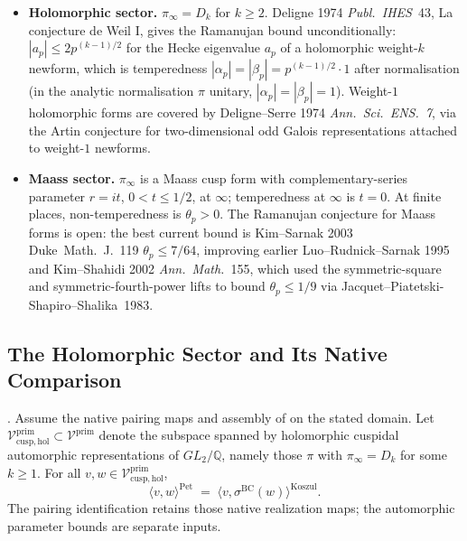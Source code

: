\begin{itemize}
\item \textbf{Holomorphic sector.} \(\pi_{\infty}=D_{k}\) for
\(k\geq 2\). Deligne 1974 \emph{Publ.~IHES}~43, La conjecture de Weil
I, gives the Ramanujan bound unconditionally: \(|a_{p}|\leq 2 p^{(k-1)/2}\)
for the Hecke eigenvalue \(a_{p}\) of a holomorphic weight-\(k\) newform,
which is temperedness
\(|\alpha_{p}|=|\beta_{p}|=p^{(k-1)/2}\cdot 1\) after normalisation
(in the analytic normalisation \(\pi\) unitary,
\(|\alpha_{p}|=|\beta_{p}|=1\)). Weight-\(1\) holomorphic forms are
covered by Deligne--Serre 1974 \emph{Ann.~Sci.~ENS.~7}, via the
Artin conjecture for two-dimensional odd Galois representations
attached to weight-\(1\) newforms.
\item \textbf{Maass sector.} \(\pi_{\infty}\) is a Maass cusp form with
complementary-series parameter \(r=it\), \(0<t\leq 1/2\), at \(\infty\);
temperedness at \(\infty\) is \(t=0\). At finite places, non-temperedness
is \(\theta_{p}>0\). The Ramanujan conjecture for Maass forms is open:
the best current bound is Kim--Sarnak 2003 Duke~Math.~J.~119
\(\theta_{p}\leq 7/64\), improving earlier Luo--Rudnick--Sarnak 1995
and Kim--Shahidi 2002 \emph{Ann.~Math.}~155, which used the
symmetric-square and symmetric-fourth-power lifts to bound
\(\theta_{p}\leq 1/9\) via Jacquet--Piatetski-Shapiro--Shalika~1983.
\end{itemize}

\subsection{The Holomorphic Sector and Its Native Comparison}
\label{v4-arith:w5-c:non-tempered:holomorphic}

\begin{theorem}
\label{v4-arith:w5-c:thm:holomorphic-cuspidal}
\ClaimStatusProvedHereConditional. Assume the native pairing maps and assembly of  on the stated domain. Let \(\mathcal{V}^{\mathrm{prim}}_{\mathrm{cusp,hol}}\subset\mathcal{V}^{\mathrm{prim}}\)
denote the subspace spanned by holomorphic cuspidal automorphic
representations of \(GL_{2}/\mathbb{Q}\), namely those \(\pi\) with
\(\pi_{\infty}=D_{k}\) for some \(k\geq 1\). For all
\(v,w\in\mathcal{V}^{\mathrm{prim}}_{\mathrm{cusp,hol}}\),
\begin{equation}
\label{v4-arith:w5-c:eq:holomorphic}
\langle v,w\rangle^{\mathrm{Pet}}
\;=\;\langle v,\sigma^{\mathrm{BC}}(w)\rangle^{\mathrm{Koszul}}.
\end{equation}
The pairing identification retains those native realization maps;
the automorphic parameter bounds are separate inputs.
\end{theorem}

